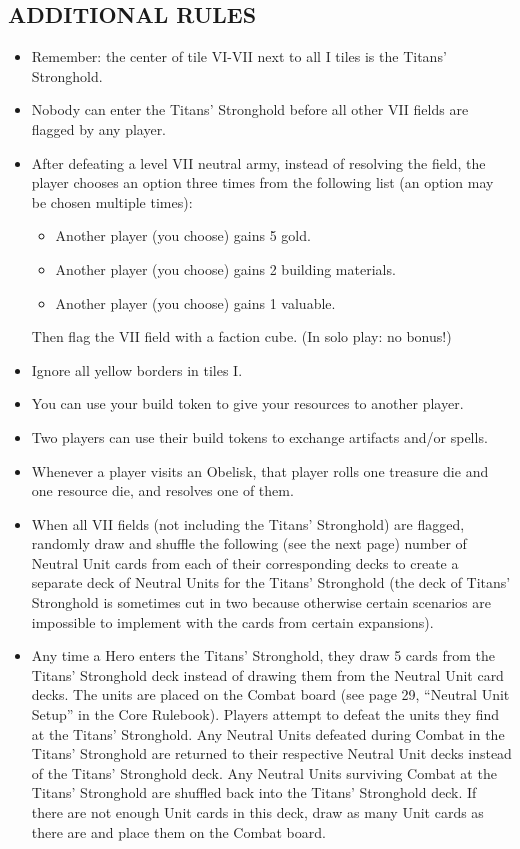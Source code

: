\begin{multicols*}{2}
\subsection*{\MakeUppercase{Additional Rules}}
\begin{itemize}
    \item Remember: the center of tile VI-VII next to all I tiles is the Titans' Stronghold.
    \item Nobody can enter the Titans' Stronghold before all other VII fields are flagged by any player.
    \item After defeating a level VII neutral army, instead of resolving the field, the player chooses an option three times from the following list (an option may be chosen multiple times):
    \begin{itemize}
        \item Another player (you choose) gains 5 gold.
        \item Another player (you choose) gains 2 building materials.
        \item Another player (you choose) gains 1 valuable.
    \end{itemize}
    Then flag the VII field with a faction cube.
    (In solo play: no bonus!)
    \item Ignore all yellow borders in tiles I.
    \item You can use your build token to give your resources to another player.
    \item Two players can use their build tokens to exchange artifacts and/or spells.
    \item Whenever a player visits an Obelisk, that player rolls one treasure die and one resource die, and resolves one of them.
    \item When all VII fields (not including the Titans' Stronghold) are flagged, randomly draw and shuffle the following (see the next page) number of Neutral Unit cards from each of their corresponding decks to create a separate deck of Neutral Units for the Titans' Stronghold (the deck of Titans' Stronghold is sometimes cut in two because otherwise certain scenarios are impossible to implement with the cards from certain expansions).
    \item Any time a Hero enters the Titans' Stronghold, they draw 5 cards from the Titans' Stronghold deck instead of drawing them from the Neutral Unit card decks. The units are placed on the Combat board (see page 29, “Neutral Unit Setup” in the Core Rulebook). Players attempt to defeat the units they find at the Titans' Stronghold. Any Neutral Units defeated during Combat in the Titans' Stronghold are returned to their respective Neutral Unit decks instead of the Titans' Stronghold deck. Any Neutral Units surviving Combat at the Titans' Stronghold are shuffled back into the Titans' Stronghold deck. If there are not enough Unit cards in this deck, draw as many Unit cards as there are and place them on the Combat board.

\end{itemize}
\end{multicols*}
